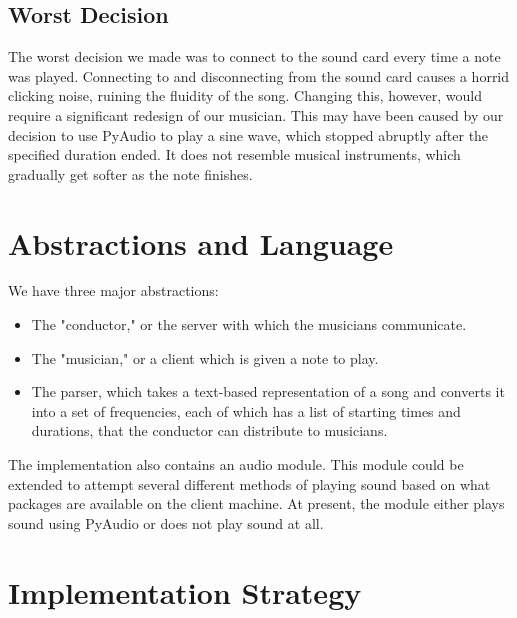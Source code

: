 \documentclass[12pt, letterpaper]{article}
\begin{document}
\subsection{Worst Decision}
The worst decision we made was to connect to the sound card every time a note was played.
Connecting to and disconnecting from the sound card causes a horrid clicking noise, ruining the
fluidity of the song. Changing this, however, would require a significant redesign of our musician.
This may have been caused by our decision to use PyAudio to play a sine wave, which stopped abruptly
after the specified duration ended. It does not resemble musical instruments, which gradually get
softer as the note finishes.


\section{Abstractions and Language} We have three major abstractions:

\begin{itemize}
\item The "conductor," or the server with which the musicians communicate.
\item The "musician," or a client which is given a note to play.
\item The parser, which takes a text-based representation of a song and converts it into a set of
frequencies, each of which has a list of starting times and durations, that the conductor can
distribute to musicians.
\end{itemize}

The implementation also contains an audio module. This module could be extended to attempt several
different methods of playing sound based on what packages are available on the client machine. At
present, the module either plays sound using PyAudio or does not play sound at all.


\section{Implementation Strategy}
\end{document}
